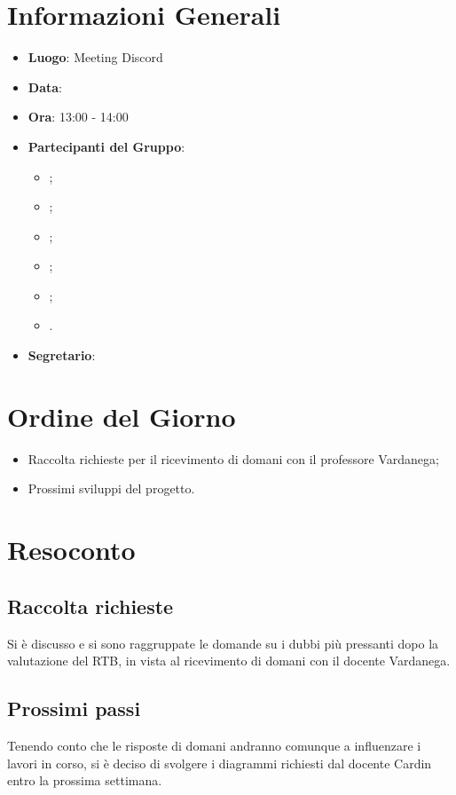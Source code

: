 \section{Informazioni Generali}

\begin{itemize}
\item{\textbf{Luogo}}: Meeting Discord
\item{\textbf{Data}}: \D
\item{\textbf{Ora}}: 13:00 - 14:00
\item{\textbf{Partecipanti del Gruppo}}: 
	\begin{itemize}
	\item{\EP{};} 
	\item{\FP{};}
	\item{\GC{};}
	\item{\LW{};}
	\item{\MG{};}
	\item{\PV{}.}
	\end{itemize} 
\item{\textbf{Segretario}}: \PV{}	
\end{itemize}

\section{Ordine del Giorno}
\begin{itemize}
\item{Raccolta richieste per il ricevimento di domani con il professore Vardanega;}
\item{Prossimi sviluppi del progetto.}
\end{itemize}

\section{Resoconto}
 
\subsection{Raccolta richieste}
Si è discusso e si sono raggruppate le domande su i dubbi più pressanti dopo la valutazione del RTB, in vista al ricevimento di domani con il docente Vardanega.

\subsection{Prossimi passi}
Tenendo conto che le risposte di domani andranno comunque a influenzare i lavori in corso, si è deciso di svolgere i diagrammi richiesti dal docente Cardin entro la prossima settimana. 
